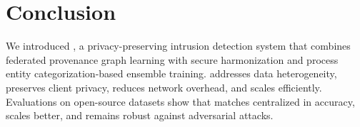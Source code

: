 \section{Conclusion}
\label{sec:conclusion}

We introduced \Sys, a privacy-preserving intrusion detection system that combines federated provenance graph learning with secure \wordvec harmonization and process entity categorization-based \gnnshort ensemble training. \Sys addresses data heterogeneity, preserves client privacy, reduces network overhead, and scales efficiently. Evaluations on open-source datasets show that \Sys matches centralized \pids in accuracy, scales better, and remains robust against adversarial attacks. 